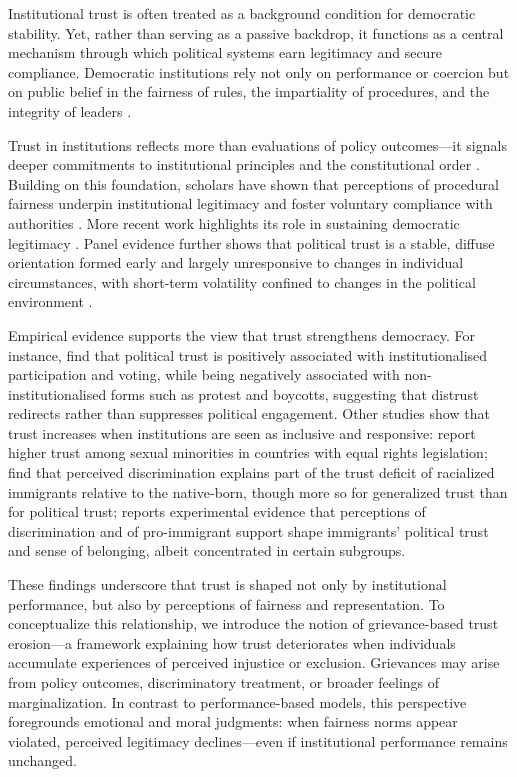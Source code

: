 \documentclass{article}
\begin{document}
Institutional trust is often treated as a background condition for democratic stability. Yet, rather than serving as a passive backdrop, it functions as a central mechanism through which political systems earn legitimacy and secure compliance. Democratic institutions rely not only on performance or coercion but on public belief in the fairness of rules, the impartiality of procedures, and the integrity of leaders \parencite{levi_legitimating_2009, citrin_political_2018}.

Trust in institutions reflects more than evaluations of policy outcomes—it signals deeper commitments to institutional principles and the constitutional order \parencite{easton_systems_1965}. Building on this foundation, scholars have shown that perceptions of procedural fairness underpin institutional legitimacy and foster voluntary compliance with authorities \parencite{tyler_why_2006}. More recent work highlights its role in sustaining democratic legitimacy \parencite{zmerli_handbook_2017}. Panel evidence further shows that political trust is a stable, diffuse orientation formed early and largely unresponsive to changes in individual circumstances, with short-term volatility confined to changes in the political environment \parencite{devine_stability_2024}.

Empirical evidence supports the view that trust strengthens democracy. For instance, \textcite{Hooghe01022013} find that political trust is positively associated with institutionalised participation and voting, while being negatively associated with non-institutionalised forms such as protest and boycotts, suggesting that distrust redirects rather than suppresses political engagement. Other studies show that trust increases when institutions are seen as inclusive and responsive: \textcite{mann_sexual_2022} report higher trust among sexual minorities in countries with equal rights legislation; \textcite{wilkes_immigration_2019} find that perceived discrimination explains part of the trust deficit of racialized immigrants relative to the native-born, though more so for generalized trust than for political trust; \textcite{tyrberg_impact_2024} reports experimental evidence that perceptions of discrimination and of pro-immigrant support shape immigrants' political trust and sense of belonging, albeit concentrated in certain subgroups.

These findings underscore that trust is shaped not only by institutional performance, but also by perceptions of fairness and representation. To conceptualize this relationship, we introduce the notion of grievance-based trust erosion—a framework explaining how trust deteriorates when individuals accumulate experiences of perceived injustice or exclusion. Grievances may arise from policy outcomes, discriminatory treatment, or broader feelings of marginalization. In contrast to performance-based models, this perspective foregrounds emotional and moral judgments: when fairness norms appear violated, perceived legitimacy declines—even if institutional performance remains unchanged.
\end{document}
